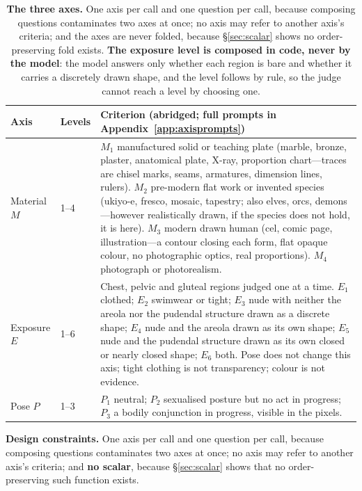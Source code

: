 \documentclass[11pt]{article}
\newcommand{\axm}{M}
\newcommand{\axe}{E}
\newcommand{\axp}{P}
\begin{document}
\begin{table}[t]
\centering\small
\begin{tabularx}{\textwidth}{@{}l l X@{}}
\toprule
Axis & Levels & Criterion (abridged; full prompts in Appendix~\ref{app:axisprompts}) \\
\midrule
Material $\axm$ & 1--4 &
$\axm_1$ manufactured solid or teaching plate (marble, bronze, plaster, anatomical
plate, X-ray, proportion chart---traces are chisel marks, seams, armatures,
dimension lines, rulers). $\axm_2$ pre-modern flat work or invented species
(ukiyo-e, fresco, mosaic, tapestry; also elves, orcs, demons---however realistically
drawn, if the species does not hold, it is here). $\axm_3$ modern drawn human (cel,
comic page, illustration---a contour closing each form, flat opaque colour, no
photographic optics, real proportions). $\axm_4$ photograph or photorealism. \\
Exposure $\axe$ & 1--6 &
Chest, pelvic and gluteal regions judged one at a time. $\axe_1$ clothed; $\axe_2$
swimwear or tight; $\axe_3$ nude with neither the areola nor the pudendal structure
drawn as a discrete shape; $\axe_4$ nude and the areola drawn as its own shape;
$\axe_5$ nude and the pudendal structure drawn as its own closed or nearly closed
shape; $\axe_6$ both. Pose does not change this axis; tight clothing is not
transparency; colour is not evidence. \\
Pose $\axp$ & 1--3 &
$\axp_1$ neutral; $\axp_2$ sexualised posture but no act in progress; $\axp_3$ a
bodily conjunction in progress, visible in the pixels. \\
\bottomrule
\end{tabularx}
\caption{\textbf{The three axes.} One axis per call and one question per call,
because composing questions contaminates two axes at once; no axis may refer to
another axis's criteria; and the axes are never folded, because \S\ref{sec:scalar}
shows no order-preserving fold exists. \textbf{The exposure level is composed in
code, never by the model}: the model answers only whether each region is bare and
whether it carries a discretely drawn shape, and the level follows by rule, so the
judge cannot reach a level by choosing one.}
\label{tab:axes}
\end{table}

\textbf{Design constraints.} One axis per call and one question per call, because
composing questions contaminates two axes at once; no axis may refer to another
axis's criteria; and \textbf{no scalar}, because \S\ref{sec:scalar} shows that no
order-preserving such function exists.
\end{document}
